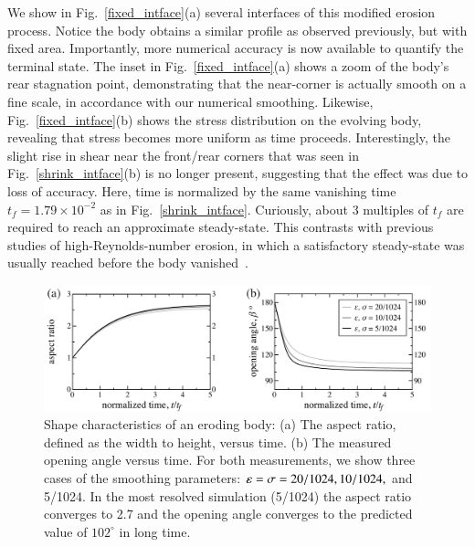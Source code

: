 \documentclass[preprint, 10pt]{elsarticle}
\begin{document}
	We show in Fig.~\ref{fixed_intface}(a) several interfaces of this modified erosion process. Notice the body obtains a similar profile as observed previously, but with fixed area. Importantly, more numerical accuracy is now available to quantify the terminal state. The inset in Fig.~\ref{fixed_intface}(a) shows a zoom of the body's rear stagnation point, demonstrating that the near-corner is actually smooth on a fine scale, in accordance with our numerical smoothing. 
Likewise, Fig.~\ref{fixed_intface}(b) shows the stress distribution on the evolving body, revealing that stress becomes more uniform as time proceeds. Interestingly, the slight rise in shear near the front/rear corners that was seen in Fig.~\ref{shrink_intface}(b) is no longer present, suggesting that the effect was due to loss of accuracy. Here, time is normalized by the same vanishing time $t_f = 1.79 \times 10^{-2}$ as in Fig.~\ref{shrink_intface}. Curiously, about 3 multiples of $t_f$ are required to reach an approximate steady-state. This contrasts with previous studies of high-Reynolds-number erosion, in which a satisfactory steady-state was usually reached before the body vanished~\cite{moo-ris-chi-zha-she2013}.

\begin{figure}%
\begin{center}
\includegraphics[width = 0.85 \textwidth]{./figs/arangle.pdf}
\caption{Shape characteristics of an eroding body: (a) The aspect ratio, defined as the width to height, versus time. (b) The measured opening angle versus time. For both measurements, we show three cases of the smoothing parameters: $\varepsilon = \sigma = 20/1024, 10/1024,$ and 5/1024. In the most resolved simulation (5/1024) the aspect ratio converges to 2.7 and the opening angle converges to the predicted value of $102^{\circ}$ in long time.}
\label{fig:arangle}
\end{center}
\end{figure}
\end{document}
